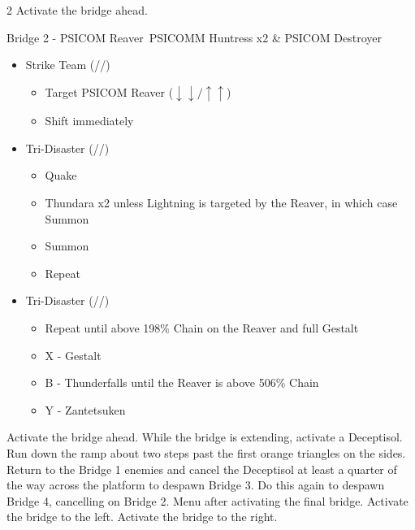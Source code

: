 \begin{paracol}{2}
	\switchcolumn*
	\renewcommand{\first}{[1] Strike Team (\com/\syn/\com)}
	\renewcommand{\second}{[2] Tri-Disaster (\rav/\rav/\rav)}
	\renewcommand{\third}{[3] Tri-Disaster (\rav/\rav/\rav)}
	\renewcommand{\fourth}{[4] Cerberus (\com/\com/\com)}
	\renewcommand{\fifth}{[5] Cerberus (\com/\com/\com)}
	Activate the bridge ahead.
	\begin{battle}{Bridge 2 - PSICOM Reaver\, PSICOMM Huntress x2 \& PSICOM Destroyer}%
		\begin{itemize}
			\item \first
			      \begin{itemize}
				      \item Target PSICOM Reaver ($\downarrow\downarrow/\uparrow\uparrow$)
				      \item Shift immediately
			      \end{itemize}
			\item \second
			      \begin{itemize}
				      \item Quake
				      \item Thundara x2 unless Lightning is targeted by the Reaver, in which case Summon
				      \item Summon
				      \item Repeat
			      \end{itemize}
			\item \third
			      \begin{itemize}
				      \item Repeat until above 198\% Chain on the Reaver and full Gestalt
				      \item X - Gestalt
				      \item B - Thunderfalls until the Reaver is above 506\% Chain
				      \item Y - Zantetsuken
			      \end{itemize}
		\end{itemize}
		   \itemdrop{1.25}{Aegisol}
	\end{battle}
	Activate the bridge ahead. While the bridge is extending, activate a Deceptisol.  Run down the ramp about two steps past the first orange triangles on the sides. Return to the Bridge 1 enemies and cancel the Deceptisol at least a quarter of the way across the platform to despawn Bridge 3. Do this again to despawn Bridge 4, cancelling on Bridge 2. Menu after activating the final bridge.
	\switchcolumn
	\renewcommand{\first}{[1] Strike Team (\com/\syn/\com)}
	\renewcommand{\second}{[2] Tri-Disaster (\rav/\rav/\rav)}
	\renewcommand{\third}{[3] Strategic Warfare (\com/\syn/\sen)}
	\renewcommand{\fourth}{[4] Tri-Disaster (\rav/\rav/\rav)}
	\renewcommand{\fifth}{[5] Cerberus (\com/\com/\com)}
	\renewcommand{\sixth}{[6] Cerberus (\com/\com/\com)}
	Activate the bridge to the left.  Activate the bridge to the right.


\end{paracol}
